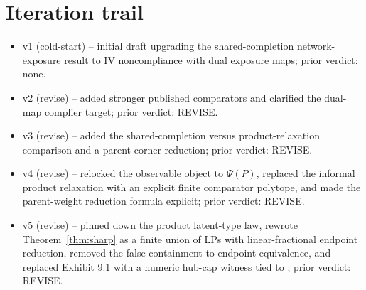 \documentclass[11pt]{article}
\newcommand{\PsiObs}{\Psi}
\theoremstyle{definition}
\theoremstyle{plain}
\theoremstyle{remark}
\begin{document}
\section{Iteration trail}
\begin{itemize}[leftmargin=*]
\item v1 (cold-start) -- initial draft upgrading the shared-completion network-exposure result to IV noncompliance with dual exposure maps; prior verdict: none.
\item v2 (revise) -- added stronger published comparators and clarified the dual-map complier target; prior verdict: REVISE.
\item v3 (revise) -- added the shared-completion versus product-relaxation comparison and a parent-corner reduction; prior verdict: REVISE.
\item v4 (revise) -- relocked the observable object to \(\PsiObs(P)\), replaced the informal product relaxation with an explicit finite comparator polytope, and made the parent-weight reduction formula explicit; prior verdict: REVISE.
\item v5 (revise) -- pinned down the product latent-type law, rewrote Theorem~\ref{thm:sharp} as a finite union of LPs with linear-fractional endpoint reduction, removed the false containment-to-endpoint equivalence, and replaced Exhibit 9.1 with a numeric hub-cap witness tied to \citet{NibberingOosterveen2025}; prior verdict: REVISE.
\end{itemize}
\end{document}
